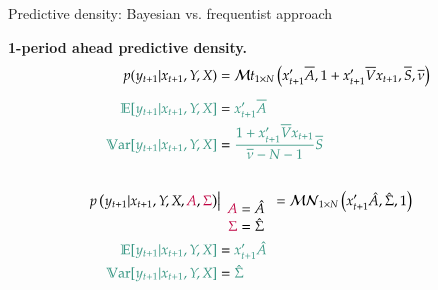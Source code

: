 \documentclass[notes,blackandwhite,mathsans,usenames,dvipsnames]{beamer}
\begin{document}
\begin{frame}{Predictive density: Bayesian vs. frequentist approach}

\textbf{1-period ahead predictive density.}
\begin{align*} 
p(y_{t+1}|x_{t+1},Y,X) &= \mathcal{M}t_{1\times N}\left( x_{t+1}'\overline{A}, 1 + x_{t+1}'\overline{V}x_{t+1}, \overline{S}, \overline{\nu} \right)\\[1ex]
{\color{mcxs2}\mathbb{E}[y_{t+1}|x_{t+1},Y,X]} &= {\color{mcxs2}x_{t+1}'\overline{A}}\\
{\color{mcxs2}\mathbb{V}\text{ar}[y_{t+1}|x_{t+1},Y,X]} &= {\color{mcxs2}\frac{1+x_{t+1}'\overline{V}x_{t+1}}{\overline{\nu}-N-1}\overline{S}}\\[4ex]
p\left(y_{t+1}|x_{t+1},Y,X, {\color{purple}A},{\color{purple}\Sigma}\right)&\big|_{\begin{array}{c}{\color{purple}A}=\hat{A}\\{\color{purple}\Sigma}=\hat\Sigma\end{array}} = \mathcal{MN}_{1\times N}\left( x_{t+1}'\hat{A}, \hat\Sigma, 1 \right)\\
{\color{mcxs2}\mathbb{E}[y_{t+1}|x_{t+1},Y,X]} &= {\color{mcxs2}x_{t+1}'\hat{A}}\\
{\color{mcxs2}\mathbb{V}\text{ar}[y_{t+1}|x_{t+1},Y,X]} &= {\color{mcxs2}\hat\Sigma}
\end{align*} 

\end{frame}
\end{document}
